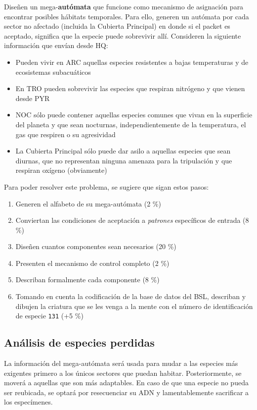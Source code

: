 \documentclass[8pt, onside]{article}
\begin{document}
Diseñen un mega-\textbf{autómata} que funcione como mecanismo de asignación para encontrar posibles hábitats temporales.
Para ello, generen un autómata por cada sector no afectado (incluida la Cubierta Principal) en donde si el packet es aceptado, significa que la especie puede sobrevivir allí.
Consideren la siguiente información que envían desde HQ:

\begin{itemize}
    \itemsep0em
    \item Pueden vivir en ARC aquellas especies resistentes a bajas temperaturas y de ecosistemas subacuáticos
    \item En TRO pueden sobrevivir las especies que respiran nitrógeno y que vienen desde PYR
    \item NOC sólo puede contener aquellas especies comunes que vivan en la superficie del planeta y que sean nocturnas, independientemente de la temperatura, el gas que respiren o su agresividad
    \item La Cubierta Principal sólo puede dar asilo a aquellas especies que sean diurnas, que no representan ninguna amenaza para la tripulación y que respiran oxígeno (obviamente)
\end{itemize}
\pagebreak
Para poder resolver este problema, se sugiere que sigan estos pasos: 

\begin{enumerate}[label=\tt \alph*)]
    \itemsep0em
    \item Generen el alfabeto de su mega-autómata (2 \%)
    \item Conviertan las condiciones de aceptación a \textit{patrones} específicos de entrada (8 \%)
    \item Diseñen cuantos componentes sean necesarios (20 \%)
    \item Presenten el mecanismo de control completo (2 \%)
    \item Describan formalmente cada componente (8 \%)
    \item Tomando en cuenta la codificación de la base de datos del BSL, describan y dibujen la criatura que se les venga a la mente con el número de identificación de especie \texttt{131} (+5 \%)
\end{enumerate}


\subsection*{Análisis de especies perdidas}

La información del mega-autómata será usada para mudar a las especies más exigentes primero a los únicos sectores que puedan habitar. Posteriormente, se moverá a aquellas que son más adaptables.
En caso de que una especie no pueda ser reubicada, se optará por resecuenciar su ADN y lamentablemente sacrificar a los especímenes.
\end{document}
